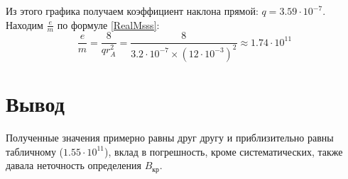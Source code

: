 \documentclass[a4paper]{article}
\begin{document}
Из этого графика получаем коэффициент наклона прямой: $q = 3.59 \cdot 10^{-7}$.\\
Находим $\frac{e}{m}$ по формуле \ref{RealMsss}:
\[\frac{e}{m} = \frac{8}{q r_A^2} = \frac{8}{3.2\cdot10^{-7}\times \left(12\cdot10^{-3}\right)^2} \approx1.74 \cdot10^{11}\]

\section*{Вывод}
Полученные значения примерно равны друг другу и приблизительно равны табличному ($1.55 \cdot 10^{11}$), вклад в погрешность, кроме систематических, также давала неточность определения $B_\text{кр}$.

\clearpage
\listoffigures
\listoftables
\end{document}
